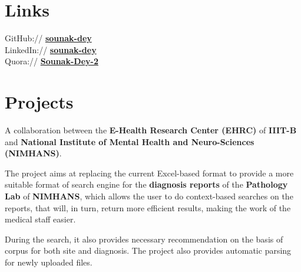 \documentclass[]{deedy-resume-openfont}
\begin{document}
\begin{minipage}[t]{0.33\textwidth}
\section{Links} 
GitHub:// \href{https://github.com/Sounak-Dey}{\bf sounak-dey} \\
LinkedIn://  \href{https://www.linkedin.com/in/sounak-dey}{\bf sounak-dey} \\
Quora://  \href{https://www.quora.com/profile/Sounak-Dey-2}{\bf Sounak-Dey-2}


%
%

\end{minipage} 
\hfill
\begin{minipage}[t]{0.66\textwidth} 


\section{Projects}

\vspace{\topsep} %
\begin{tightemize}
\item A collaboration between the \textbf{E-Health Research Center (EHRC)} of \textbf{IIIT-B} and  \textbf{National Institute of Mental Health and Neuro-Sciences (NIMHANS)}. 
\item The project aims at replacing the current Excel-based format to provide a more suitable format of search engine for the \textbf{diagnosis reports} of the \textbf{Pathology Lab} of \textbf{NIMHANS}, which allows the user to do context-based searches on the reports, that will, in turn, return more efficient results, making the work of the medical staff easier.
\item During the search, it also provides necessary recommendation on the basis of corpus for both site and diagnosis. The project also provides automatic parsing for newly uploaded files. 
\end{tightemize}
\sectionsep


\end{minipage}
\end{document}
